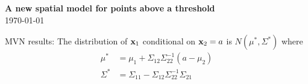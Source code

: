 \documentclass[11pt]{article}
\begin{document}
\linenumbers

\begin{center}
{\Large {\bf A new spatial model for points above a threshold}}\\
\today
\end{center}

MVN results:
The distribution of $\mbox{\bf x}_1$ conditional on $\mbox{\bf x}_2 = a$ is $N( \mu^*, \Sigma^*)$ where
\begin{align*}
  \mu^* &= \mu_1 + \Sigma_{12} \Sigma_{22}^{-1} (a - \mu_2)\\
  \Sigma^* &= \Sigma_{11} - \Sigma_{12} \Sigma_{22}^{-1} \Sigma_{21}
\end{align*}
\end{document}
